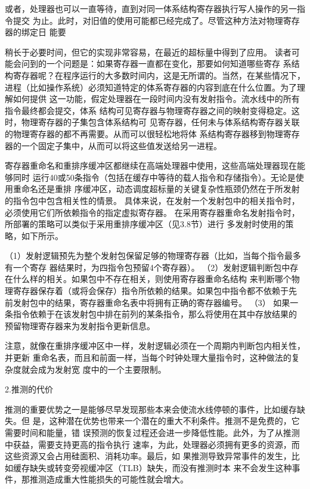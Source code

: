 或者，处理器也可以一直等待，直到对同一体系结构寄存器执行写人操作的另一指令提交
为止。此时，对旧值的使用可能都已经完成了。尽管这种方法对物理寄存器的绑定日
能要

稍长于必要时间，但它的实现非常容易，在最近的超标量中得到了应用。
读者可能会问到的一个问题是：如果寄存器一直都在变化，那要如何知道哪些寄存
系结构寄存器呢？在程序运行的大多数时间内，这是无所谓的。当然，在某些情况下，
进程（比如操作系统）必须知道特定的体系寄存器的内容到底在什么位置。为了理解如何提供
这一功能，假定处理器在一段时间内没有发射指令。流水线中的所有指令最终都会提交，体系
结构可见寄存器与物理寄存器之间的映射变得稳定。这时，物理寄存器的子集包含体系结构可
见寄存器，任何未与体系结构寄存器关联的物理寄存器的都不再需要。从而可以很轻松地将体
系结构寄存器移到物理寄存器的一个固定子集中，从而可以将这些值发送给另一进程。

寄存器重命名和重排序缓冲区都继续在高端处理器中使用，这些高端处理器现在能够同时
运行40或50条指令（包括在缓存中等待的载人指令和存储指令）。无论是使用重命名还是重排
序缓冲区，动态调度超标量的关键复杂性瓶颈仍然在于所发射的指令包中包含相关性的情景。
具体来说，在发射一个发射包中的相关指令时，必须使用它们所依赖指令的指定虚拟寄存器。
在采用寄存器重命名发射指令时，所部署的策略可以类似于采用重排序缓冲区（见3.8节）进行
多发射时使用的策略，如下所示。

（1）发射逻辑预先为整个发射包保留足够的物理寄存器（比如，当每个指令最多有一个寄存
器结果时，为四指令包预留4个寄存器）。
（2）发射逻辑判断包中存在什么样的相关。如果包中不存在相关，则使用寄存器重命名结构
来判断哪个物理寄存器保存着（或将会保存）指令所依赖的结果。如果包中指令都不依赖于先
前发射包中的结果，寄存器重命名表中将拥有正确的寄存器编号。
（3） 如果一条指令依赖于在该发射包中排在前列的某条指令，那么将使用在其中存放结果的
预留物理寄存器来为发射指令更新信息。

注意，就像在重排序缓冲区中一样，发射逻辑必须在一个周期内判断包内相关性，并更新
重命名表，而且和前面一样，当每个时钟处理大量指令时，这种做法的复杂度就会成为发射宽
度中的一个主要限制。

2.推测的代价

推测的重要优势之一是能够尽早发现那些本来会使流水线停顿的事件，比如缓存缺失。但
是，这种潜在优势也带来一个潜在的重大不利条件。推测不是免费的，它需要时间和能量，错
误预测的恢复过程还会进一步降低性能。此外，为了从推测中获益，需要支持更高的指令执行
速率，为此，处理器必须拥有更多的资源，而这些资源又会占用硅面积、消耗功率。最后，如
果推测导致异常事件的发生，比如缓存缺失或转变旁视缓冲区（TLB）缺失，而没有推测时本
来不会发生这种事件，那推测造成重大性能损失的可能性就会增大。

